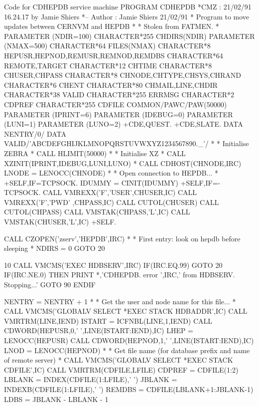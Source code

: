 \begin{XMPt}{Code for CDHEPDB service machine}
      PROGRAM CDHEPDB
*CMZ :          21/02/91  16.24.17  by  Jamie Shiers
*-- Author :    Jamie Shiers   21/02/91
*     Program to move updates between CERNVM and HEPDB
*
*     Stolen from FATMEN.
*
      PARAMETER     (NDIR=100)
      CHARACTER*255 CHDIRS(NDIR)
      PARAMETER     (NMAX=500)
      CHARACTER*64  FILES(NMAX)
      CHARACTER*8   HEPUSR,HEPNOD,REMUSR,REMNOD,REMDBS
      CHARACTER*64  REMOTE,TARGET
      CHARACTER*12  CHTIME
      CHARACTER*8   CHUSER,CHPASS
      CHARACTER*8   CHNODE,CHTYPE,CHSYS,CHRAND
      CHARACTER*6   CHENT
      CHARACTER*80  CHMAIL,LINE,CHDIR
      CHARACTER*38  VALID
      CHARACTER*255 ERRMSG
      CHARACTER*2   CDPREF
      CHARACTER*255 CDFILE
      COMMON/PAWC/PAW(50000)
      PARAMETER     (IPRINT=6)
      PARAMETER     (IDEBUG=0)
      PARAMETER     (LUNI=1)
      PARAMETER     (LUNO=2)
+CDE,QUEST.
+CDE,SLATE.
      DATA          NENTRY/0/
      DATA          VALID/'ABCDEFGHIJKLMNOPQRSTUVWXYZ1234567890._'/
*
*     Initialise ZEBRA
*
      CALL HLIMIT(50000)
*
*     Initialise XZ
*
      CALL XZINIT(IPRINT,IDEBUG,LUNI,LUNO)
*
      CALL CDHOST(CHNODE,IRC)
      LNODE = LENOCC(CHNODE)
*
*     Open connection to HEPDB...
*
+SELF,IF=TCPSOCK.
      IDUMMY = CINIT(IDUMMY)
+SELF,IF=-TCPSOCK.
      CALL VMREXX('F','USER',CHUSER,IC)
      CALL VMREXX('F','PWD' ,CHPASS,IC)
      CALL CUTOL(CHUSER)
      CALL CUTOL(CHPASS)
      CALL VMSTAK(CHPASS,'L',IC)
      CALL VMSTAK(CHUSER,'L',IC)
+SELF.
 
      CALL CZOPEN('zserv','HEPDB',IRC)
*
*     First entry: look on hepdb before sleeping
*
      NDIRS = 0
      GOTO 20
 
   10 CALL VMCMS('EXEC HDBSERV',IRC)
      IF(IRC.EQ.99) GOTO 20
      IF(IRC.NE.0) THEN
         PRINT *,'CDHEPDB. error ',IRC,' from HDBSERV. Stopping...'
         GOTO 90
      ENDIF
 
      NENTRY = NENTRY + 1
*
*     Get the user and node name for this file...
*
      CALL VMCMS('GLOBALV SELECT *EXEC STACK HDBADDR',IC)
      CALL VMRTRM(LINE,IEND)
      ISTART = ICFNBL(LINE,1,IEND)
      CALL CDWORD(HEPUSR,0,' ',LINE(ISTART:IEND),IC)
      LHEP   = LENOCC(HEPUSR)
      CALL CDWORD(HEPNOD,1,' ',LINE(ISTART:IEND),IC)
      LNOD   = LENOCC(HEPNOD)
*
*     Get file name (for database prefix and name of remote server)
*
      CALL VMCMS('GLOBALV SELECT *EXEC STACK CDFILE',IC)
      CALL VMRTRM(CDFILE,LFILE)
      CDPREF = CDFILE(1:2)
      LBLANK = INDEX(CDFILE(1:LFILE),' ')
      JBLANK = INDEXB(CDFILE(1:LFILE),' ')
      REMDBS = CDFILE(LBLANK+1:JBLANK-1)
      LDBS   = JBLANK - LBLANK - 1
 

\end{XMPt}
